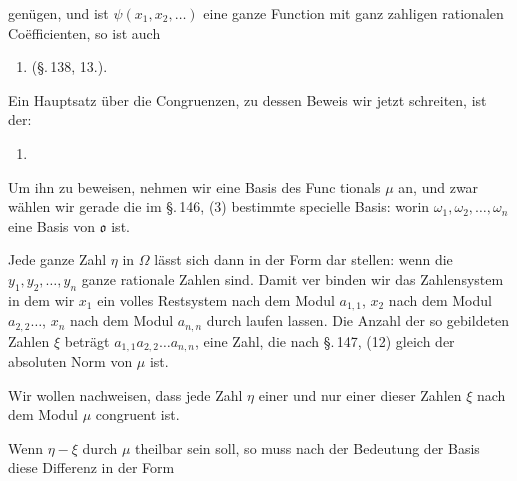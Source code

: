 genügen, und ist $\psi(x_1, x_2, \ldots)$ eine ganze Function mit ganz\-
zahligen rationalen Co\"efficienten, so ist auch

\begin{enumerate}
\item[2.]  (\S.\,138, 13.).
\end{enumerate}

Ein Hauptsatz über die Congruenzen, zu dessen Beweis wir
jetzt schreiten, ist der:

\begin{enumerate}
\item[3.] 
\end{enumerate}

Um ihn zu beweisen, nehmen wir eine Basis des Func\-
tionals $\mu$ an, und zwar wählen wir gerade die im \S.\,146, (3)
bestimmte specielle Basis:
worin $\omega_1, \omega_2, \ldots, \omega_n$ eine Basis von $\mathfrak{o}$ ist.

Jede ganze Zahl $\eta$ in $\Omega$ lässt sich dann in der Form dar\-
stellen:
wenn die $y_1, y_2, \ldots, y_n$ ganze rationale Zahlen sind. Damit ver\-
binden wir das Zahlensystem
in dem wir $x_1$ ein volles Restsystem nach dem Modul $a_{1,1}$,
$x_2$ nach dem Modul $a_{2,2} \ldots$, $x_n$ nach dem Modul $a_{n,n}$ durch\-
laufen lassen. Die Anzahl der so gebildeten Zahlen $\xi$ beträgt
$a_{1,1}a_{2,2}\ldots a_{n,n}$, eine Zahl, die nach \S.\,147, (12) gleich der
absoluten Norm von $\mu$ ist.

Wir wollen nachweisen, dass jede Zahl $\eta$ einer und nur
einer dieser Zahlen $\xi$ nach dem Modul $\mu$ congruent ist.

Wenn $\eta - \xi$ durch $\mu$ theilbar sein soll, so muss nach der
Bedeutung der Basis diese Differenz in der Form

